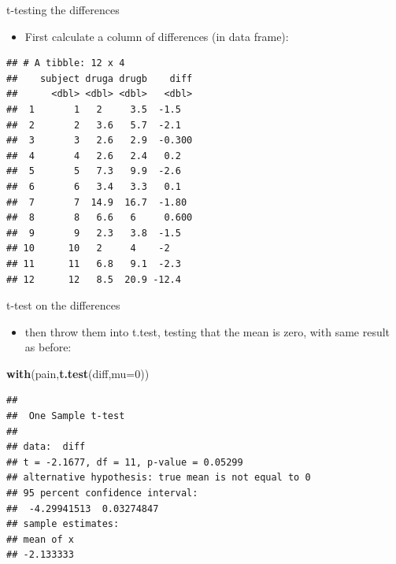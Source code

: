 \documentclass[
  ignorenonframetext,
]{beamer}
\newenvironment{Shaded}{\begin{snugshade}}{\end{snugshade}}
\newcommand{\DataTypeTok}[1]{\textcolor[rgb]{0.13,0.29,0.53}{#1}}
\newcommand{\DecValTok}[1]{\textcolor[rgb]{0.00,0.00,0.81}{#1}}
\newcommand{\KeywordTok}[1]{\textcolor[rgb]{0.13,0.29,0.53}{\textbf{#1}}}
\newcommand{\NormalTok}[1]{#1}
\newcommand{\OperatorTok}[1]{\textcolor[rgb]{0.81,0.36,0.00}{\textbf{#1}}}
\newcommand{\StringTok}[1]{\textcolor[rgb]{0.31,0.60,0.02}{#1}}
\providecommand{\tightlist}{%
  \setlength{\itemsep}{0pt}\setlength{\parskip}{0pt}}
\begin{document}
\begin{frame}[fragile]{t-testing the differences}
\protect\hypertarget{t-testing-the-differences}{}

\begin{itemize}
\tightlist
\item
  First calculate a column of differences (in data frame):
\end{itemize}

\begin{Shaded}
\end{Shaded}

\begin{verbatim}
## # A tibble: 12 x 4
##    subject druga drugb    diff
##      <dbl> <dbl> <dbl>   <dbl>
##  1       1   2     3.5  -1.5  
##  2       2   3.6   5.7  -2.1  
##  3       3   2.6   2.9  -0.300
##  4       4   2.6   2.4   0.2  
##  5       5   7.3   9.9  -2.6  
##  6       6   3.4   3.3   0.1  
##  7       7  14.9  16.7  -1.80 
##  8       8   6.6   6     0.600
##  9       9   2.3   3.8  -1.5  
## 10      10   2     4    -2    
## 11      11   6.8   9.1  -2.3  
## 12      12   8.5  20.9 -12.4
\end{verbatim}

\end{frame}

\begin{frame}[fragile]{t-test on the differences}
\protect\hypertarget{t-test-on-the-differences}{}

\begin{itemize}
\tightlist
\item
  then throw them into t.test, testing that the mean is zero, with same
  result as before:
\end{itemize}

\begin{Shaded}
\begin{Highlighting}[]
\KeywordTok{with}\NormalTok{(pain,}\KeywordTok{t.test}\NormalTok{(diff,}\DataTypeTok{mu=}\DecValTok{0}\NormalTok{))}
\end{Highlighting}
\end{Shaded}

\begin{verbatim}
## 
##  One Sample t-test
## 
## data:  diff
## t = -2.1677, df = 11, p-value = 0.05299
## alternative hypothesis: true mean is not equal to 0
## 95 percent confidence interval:
##  -4.29941513  0.03274847
## sample estimates:
## mean of x 
## -2.133333
\end{verbatim}

\end{frame}
\end{document}
